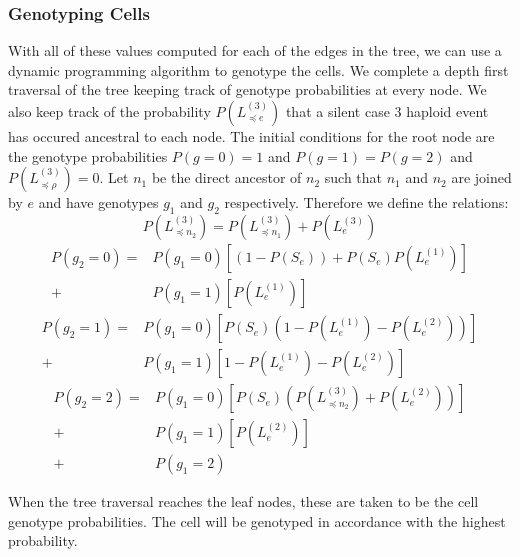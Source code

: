 \documentclass[../../main.tex]{subfiles}
\begin{document}
\subsubsection*{Genotyping Cells}
With all of these values computed for each of the edges in the tree, we can use a dynamic programming algorithm to genotype the cells. We complete a depth first traversal of the tree keeping track of genotype probabilities at every node. We also keep track of the probability $P(L_{\preceq e}^{(3)})$ that a silent case 3 haploid event has occured ancestral to each node. The initial conditions for the root node are the genotype probabilities $P(g=0)=1$ and $P(g=1)=P(g=2)$ and $P(L_{\preceq \rho}^{(3)}) = 0$. Let $n_1$ be the direct ancestor of $n_2$ such that $n_1$ and $n_2$ are joined by $e$ and have genotypes $g_1$ and $g_2$ respectively. Therefore we define the relations:
\begin{equation*}
P(L^{(3)}_{\preceq n_2}) = P(L^{(3)}_{\preceq n_1}) +P(L^{(3)}_e)
\end{equation*}
\begin{align*}
P(g_2 = 0) = &P(g_1=0)\left[(1-P(S_e))+P(S_e)P(L^{(1)}_e)\right]\\
+ &P(g_1 = 1)\left[P(L^{(1)}_e)\right]
\end{align*}
\begin{align*}
P(g_2 = 1) = &P(g_1=0)\left[P(S_e)(1-P(L^{(1)}_e)-P(L^{(2)}_e))\right]\\
+ &P(g_1 = 1)\left[1-P(L^{(1)}_e)-P(L^{(2)}_e)\right]
\end{align*}
\begin{align*}
P(g_2=2) = &P(g_1=0)\left[P(S_e)(P(L^{(3)}_{\preceq n_2}) + P(L^{(2)}_e))\right]\\
+ &P(g_1=1)\left[P(L^{(2)}_e)\right]\\
+ &P(g_1=2)
\end{align*}

When the tree traversal reaches the leaf nodes, these are taken to be the cell genotype probabilities. The cell will be genotyped in accordance with the highest probability.
\end{document}
